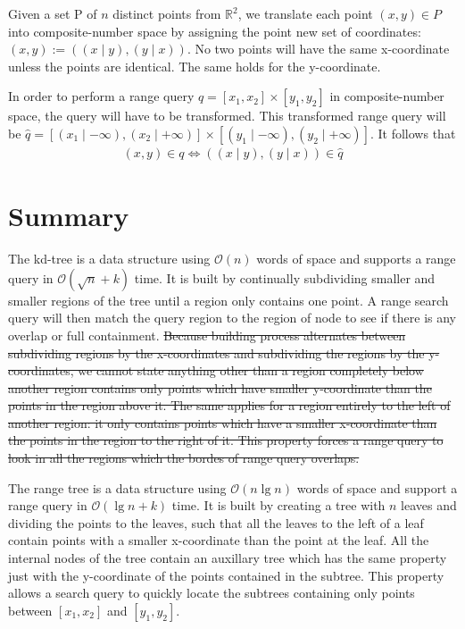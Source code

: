 \documentclass[twoside,11pt,openright]{report}
\newcommand{\todo}[1]{{\color[rgb]{.5,0,0}\textbf{$\blacktriangleright$#1$\blacktriangleleft$}}}
\providecommand{\DIFdel}[1]{{\protect\color{red}\sout{#1}}}                      %
\providecommand{\DIFdelbegin}{} %
\providecommand{\DIFdelend}{} %
\begin{document}
\noindent Given a set P of $n$ distinct points from $\mathbb{R}^2$, we translate each point $(x,y) \in P$ into composite-number space by assigning the point new set of coordinates: $(x,y) := ( (x \mid y), (y \mid x) )$. No two points will have the same x-coordinate unless the points are identical. The same holds for the y-coordinate.

\noindent In order to perform a range query $q = [x_1, x_2] \times [y_1, y_2]$ in composite-number space, the query will have to be transformed. This transformed range query will be $\hat{q} = [(x_1 \mid -\infty), (x_2 \mid +\infty)] \times [(y_1 \mid -\infty), (y_2 \mid +\infty)]$. It follows that 
\begin{align*}
  (x,y) \in q \iff ( (x \mid y), (y \mid x) ) \in \hat{q}
\end{align*}


\section{Summary}
\label{sect:relsummary}

The kd-tree is a data structure using $\mathcal{O}(n)$ words of space and supports a range query in $\mathcal{O}(\sqrt{n} + k)$ time. It is built by continually subdividing smaller and smaller regions of the tree until a region only contains one point. A range search query will then match the query region to the region of node to see if there is any overlap or full containment. 
\DIFdelbegin \DIFdel{Because building process alternates between subdividing regions by the x-coordinates and subdividing the regions by the y-coordinates, we cannot state anything other than a region completely below another region contains only points which have smaller y-coordinate than the points in the region above it. The same applies for a region entirely to the left of another region: it only contains points which have a smaller x-coordinate than the points in the region to the right of it. This property forces a range query to look in all the regions which the bordes of range query overlaps. }%
\DIFdelend 

The range tree is a data structure using $\mathcal{O}(n \lg n)$ words of space and support a range query in $\mathcal{O}(\lg n + k)$ time. It is built by creating a tree with $n$ leaves and dividing the points to the leaves, such that all the leaves to the left of a leaf contain points with a smaller x-coordinate than the point at the leaf. All the internal nodes of the tree contain an auxillary tree which has the same property just with the y-coordinate of the points contained in the subtree. This property allows a search query to quickly locate the subtrees containing only points between $[x_1, x_2]$ and $[y_1, y_2]$.
\end{document}
